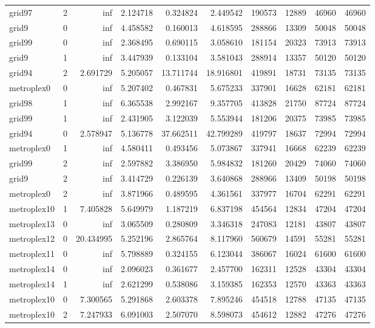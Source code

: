 \begin{longtable}{|l|r|r|r|r|r|r|r|r|r|}
grid97 & 2 & inf & 2.124718 & 0.324824 & 2.449542 & 190573 & 12889 & 46960 & 46960 \\
grid9 & 0 & inf & 4.458582 & 0.160013 & 4.618595 & 288866 & 13309 & 50048 & 50048 \\
grid99 & 0 & inf & 2.368495 & 0.690115 & 3.058610 & 181154 & 20323 & 73913 & 73913 \\
grid9 & 1 & inf & 3.447939 & 0.133104 & 3.581043 & 288914 & 13357 & 50120 & 50120 \\
grid94 & 2 & 2.691729 & 5.205057 & 13.711744 & 18.916801 & 419891 & 18731 & 73135 & 73135 \\
metroplex0 & 0 & inf & 5.207402 & 0.467831 & 5.675233 & 337901 & 16628 & 62181 & 62181 \\
grid98 & 1 & inf & 6.365538 & 2.992167 & 9.357705 & 413828 & 21750 & 87724 & 87724 \\
grid99 & 1 & inf & 2.431905 & 3.122039 & 5.553944 & 181206 & 20375 & 73985 & 73985 \\
grid94 & 0 & 2.578947 & 5.136778 & 37.662511 & 42.799289 & 419797 & 18637 & 72994 & 72994 \\
metroplex0 & 1 & inf & 4.580411 & 0.493456 & 5.073867 & 337941 & 16668 & 62239 & 62239 \\
grid99 & 2 & inf & 2.597882 & 3.386950 & 5.984832 & 181260 & 20429 & 74060 & 74060 \\
grid9 & 2 & inf & 3.414729 & 0.226139 & 3.640868 & 288966 & 13409 & 50198 & 50198 \\
metroplex0 & 2 & inf & 3.871966 & 0.489595 & 4.361561 & 337977 & 16704 & 62291 & 62291 \\
metroplex10 & 1 & 7.405828 & 5.649979 & 1.187219 & 6.837198 & 454564 & 12834 & 47204 & 47204 \\
metroplex13 & 0 & inf & 3.065509 & 0.280809 & 3.346318 & 247083 & 12181 & 43807 & 43807 \\
metroplex12 & 0 & 20.434995 & 5.252196 & 2.865764 & 8.117960 & 560679 & 14591 & 55281 & 55281 \\
metroplex11 & 0 & inf & 5.798889 & 0.324155 & 6.123044 & 386067 & 16024 & 61600 & 61600 \\
metroplex14 & 0 & inf & 2.096023 & 0.361677 & 2.457700 & 162311 & 12528 & 43304 & 43304 \\
metroplex14 & 1 & inf & 2.621299 & 0.538086 & 3.159385 & 162353 & 12570 & 43363 & 43363 \\
metroplex10 & 0 & 7.300565 & 5.291868 & 2.603378 & 7.895246 & 454518 & 12788 & 47135 & 47135 \\
metroplex10 & 2 & 7.247933 & 6.091003 & 2.507070 & 8.598073 & 454612 & 12882 & 47276 & 47276 \\

\end{longtable}
